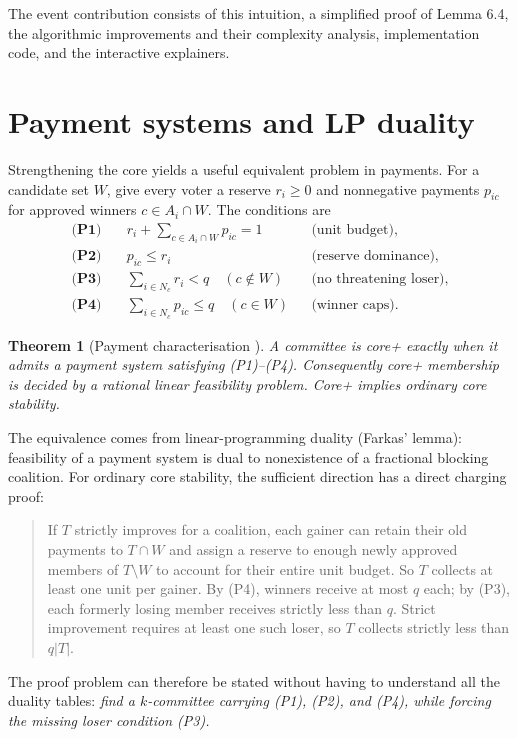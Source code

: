 \documentclass[11pt,a4paper]{article}
\newtheorem{theorem}{Theorem}[section]
\theoremstyle{definition}
\theoremstyle{remark}
\begin{document}
The event contribution consists of this intuition, a simplified proof of Lemma 6.4, the algorithmic improvements and their complexity analysis, implementation code, and the interactive explainers.

\section{Payment systems and LP duality}
Strengthening the core yields a useful equivalent problem in payments. For a candidate set $W$, give every voter a reserve $r_i\ge0$ and nonnegative payments $p_{ic}$ for approved winners $c\in A_i\cap W$. The conditions are
\begin{align*}
\textbf{(P1)}\quad&r_i+\sum_{c\in A_i\cap W}p_{ic}=1
   &&\text{(unit budget)},\\
\textbf{(P2)}\quad&p_{ic}\le r_i
   &&\text{(reserve dominance)},\\
\textbf{(P3)}\quad&\sum_{i\in N_c}r_i<q\quad(c\notin W)
   &&\text{(no threatening loser)},\\
\textbf{(P4)}\quad&\sum_{i\in N_c}p_{ic}\le q\quad(c\in W)
   &&\text{(winner caps)}.
\end{align*}

\begin{theorem}[Payment characterisation \cite{bgp}]
A committee is core+ exactly when it admits a payment system satisfying (P1)--(P4). Consequently core+ membership is decided by a rational linear feasibility problem. Core+ implies ordinary core stability.
\end{theorem}
The equivalence comes from linear-programming duality (Farkas' lemma): feasibility of a payment system is dual to nonexistence of a fractional blocking coalition. For ordinary core stability, the sufficient direction has a direct charging proof:
\begin{quote}
If $T$ strictly improves for a coalition, each gainer can retain their old payments to $T\cap W$ and assign a reserve to enough newly approved members of $T\setminus W$ to account for their entire unit budget. So $T$ collects at least one unit per gainer. By (P4), winners receive at most $q$ each; by (P3), each formerly losing member receives strictly less than $q$. Strict improvement requires at least one such loser, so $T$ collects strictly less than $q|T|$.
\end{quote}
The proof problem can therefore be stated without having to understand all the duality tables: \emph{find a $k$-committee carrying (P1), (P2), and (P4), while forcing the missing loser condition (P3).}
\end{document}
